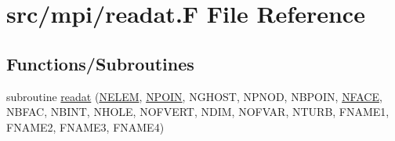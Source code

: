 \hypertarget{mpi_2readat_8_f}{\section{src/mpi/readat.F File Reference}
\label{mpi_2readat_8_f}
}
\subsection*{Functions/\-Subroutines}
\begin{DoxyCompactItemize}
\item 
subroutine \hyperlink{mpi_2readat_8_f_aa00d344ba9f5d129f63e7747fe2397d4}{readat} (\hyperlink{mesh_8com_aee5e75b79d0e815c0603cfbccc618957}{N\-E\-L\-E\-M}, \hyperlink{mesh_8com_ae28c1572321efcd8715b974d87d20c58}{N\-P\-O\-I\-N}, N\-G\-H\-O\-S\-T, N\-P\-N\-O\-D, N\-B\-P\-O\-I\-N, \hyperlink{mesh_8com_a78142d59d4cbb9fedbede16187658dd3}{N\-F\-A\-C\-E}, N\-B\-F\-A\-C, N\-B\-I\-N\-T, N\-H\-O\-L\-E, N\-O\-F\-V\-E\-R\-T, N\-D\-I\-M, N\-O\-F\-V\-A\-R, N\-T\-U\-R\-B, F\-N\-A\-M\-E1, F\-N\-A\-M\-E2, F\-N\-A\-M\-E3, F\-N\-A\-M\-E4)
\end{DoxyCompactItemize}


